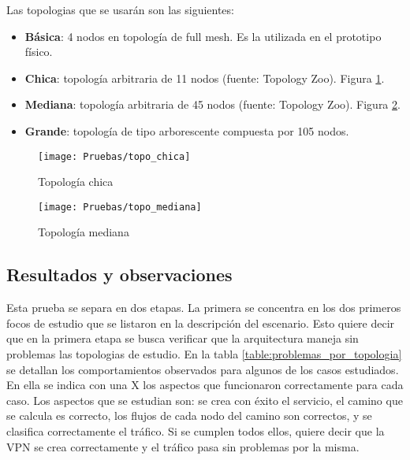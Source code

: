 Las topologias que se usarán son las siguientes:
\begin{itemize}
	\item \textbf{Básica}: 4 nodos en topología de full mesh. Es la utilizada en el prototipo físico.
	\item \textbf{Chica}: topología arbitraria de 11 nodos (fuente: Topology Zoo). Figura \ref{fig:topo_chica}.
	\item \textbf{Mediana}: topología arbitraria de 45 nodos (fuente: Topology Zoo). Figura \ref{fig:topo_mediana}.
	\item \textbf{Grande}: topología de tipo arborescente compuesta por 105 nodos.
\end{itemize}

\begin{figure}[t]
\caption{Topología chica}
\texttt{[image: Pruebas/topo\_chica]}
\centering
\label{fig:topo_chica}
\end{figure}

\begin{figure}[t]
\caption{Topología mediana}
\texttt{[image: Pruebas/topo\_mediana]}
\centering
\label{fig:topo_mediana}
\end{figure}

\subsection{Resultados y observaciones}
Esta prueba se separa en dos etapas. La primera se concentra en los dos primeros focos de estudio que se listaron en la descripción del escenario. Esto quiere decir que en la primera etapa se busca verificar que la arquitectura maneja sin problemas las topologias de estudio. En la tabla \ref{table:problemas_por_topologia} se detallan los comportamientos observados para algunos de los casos estudiados. En ella se indica con una X los aspectos que funcionaron correctamente para cada caso. Los aspectos que se estudian son: se crea con éxito el servicio, el camino que se calcula es correcto, los flujos de cada nodo del camino son correctos, y se clasifica correctamente el tráfico. Si se cumplen todos ellos, quiere decir que la VPN se crea correctamente y el tráfico pasa sin problemas por la misma.

